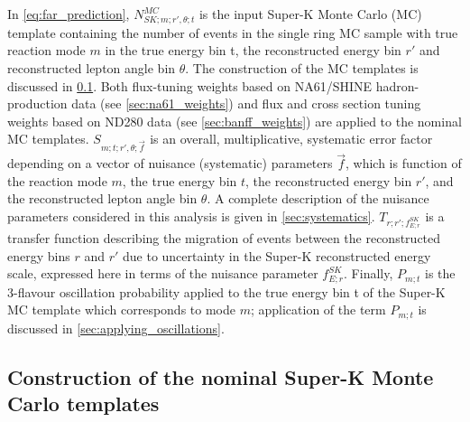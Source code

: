 In \cref{eq:far_prediction}, $N_{SK;m;r\prime,\theta;t}^{MC}$ is the input Super-K Monte Carlo (MC) template 
containing the number of events in the single ring MC sample with true reaction mode $m$ in the 
true energy bin t, the reconstructed energy bin $r\prime$ and reconstructed lepton angle bin $\theta$.
The construction of the MC templates is discussed in \cref{sec:mc_templates}.
Both flux-tuning weights based on NA61/SHINE hadron-production data (see \cref{sec:na61_weights})
and flux and cross section tuning weights based on ND280 data (see \cref{sec:banff_weights})
are applied to the nominal MC templates.
$S_{m;t;r\prime,\theta;\vec{f}}$ is an overall, multiplicative, systematic error factor 
depending on a vector of nuisance (systematic) parameters $\vec{f}$,
which is function of the reaction mode $m$, the true energy bin $t$, the reconstructed energy bin $r\prime$,
and the reconstructed lepton angle bin $\theta$.
A complete description of the nuisance parameters considered in this analysis is given in \cref{sec:systematics}.
$T_{r;r\prime;f_{E; r}^{SK}}$ is a transfer function describing the migration of events
between the reconstructed energy bins $r$ and $r\prime$ due to uncertainty in the Super-K reconstructed energy
scale, expressed here in terms of the nuisance parameter $f_{E; r}^{SK}$.
Finally, $P_{m;t}$ is the 3-flavour oscillation probability applied to the true energy
bin t of the Super-K MC template which corresponds to mode $m$;
application of the term $P_{m;t}$ is discussed in \cref{sec:applying_oscillations}.


\subsection {Construction of the nominal Super-K Monte Carlo templates}
\label{sec:mc_templates}

